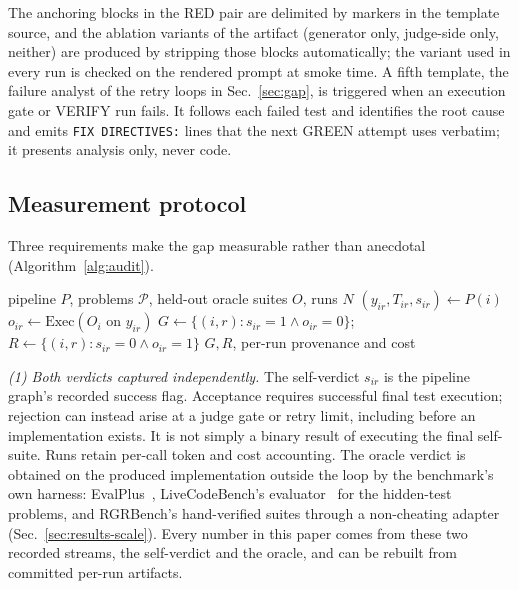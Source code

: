 \documentclass{article}
\begin{document}
The anchoring blocks in the RED pair are delimited by markers in the template source, and the
ablation variants of the artifact (generator only, judge-side only, neither) are produced by
stripping those blocks automatically; the variant used in every run is checked on the rendered prompt
at smoke time. A fifth template, the failure analyst of the retry loops in Sec.~\ref{sec:gap},
is triggered when an execution gate or VERIFY run fails. It follows each failed test and identifies the
root cause and emits \texttt{FIX DIRECTIVES:} lines that the next GREEN attempt uses
verbatim; it presents analysis only, never code.

\subsection{Measurement protocol}
\label{sec:protocol}

Three requirements make the gap measurable rather than anecdotal (Algorithm~\ref{alg:audit}).

\begin{algorithm}[t]
\caption{Verification-gap measurement over instrumented runs}
\label{alg:audit}
\begin{algorithmic}[1]
\Require pipeline $P$, problems $\mathcal{P}$, held-out oracle suites $O$, runs $N$
  \State $(y_{ir}, T_{ir}, s_{ir}) \gets P(i)$ 
  \State $o_{ir} \gets \mathrm{Exec}(O_i \text{ on } y_{ir})$ 
\EndFor
\State $G \gets \{ (i,r) : s_{ir}{=}1 \wedge o_{ir}{=}0 \}$;\quad $R \gets \{ (i,r) : s_{ir}{=}0 \wedge o_{ir}{=}1 \}$
\State \Return $G, R$, per-run provenance and cost
\end{algorithmic}
\end{algorithm}

\emph{(1) Both verdicts captured independently.} The self-verdict $s_{ir}$ is the pipeline
graph's recorded success flag. Acceptance requires successful final test execution; rejection
can instead arise at a judge gate or retry limit, including before an implementation exists.
It is not simply a binary result of executing the final self-suite. Runs retain per-call
token and cost accounting. The
oracle verdict is obtained on the produced implementation outside the loop by the benchmark's own
harness: EvalPlus~\cite{liu2023evalplus}, LiveCodeBench's evaluator~\cite{jain2024livecodebench}
for the hidden-test problems, and RGRBench's hand-verified suites through a non-cheating adapter
(Sec.~\ref{sec:results-scale}). Every number in this paper comes from these two recorded
streams, the self-verdict and the oracle, and can be rebuilt from committed per-run artifacts.
\end{document}
